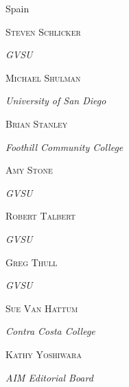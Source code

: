 \documentclass[10pt,]{book}
\theoremstyle{plain}
\theoremstyle{definition}
\theoremstyle{definition}
\theoremstyle{definition}
\theoremstyle{definition}
\numberwithin{equation}{section}
\newcommand{\contributor}[1]{\parbox{\linewidth}{#1}\par\bigskip}
\newcommand{\contributorname}[1]{\textsc{#1}\\[0.25\baselineskip]}
\newcommand{\contributorinfo}[1]{\hspace*{0.05\linewidth}\parbox{0.95\linewidth}{\textsl{#1}}}
\begin{document}
\begin{multicols}{2}
{{Spain}%
}%
\hypertarget{contributor-15}{}%
\contributor{%
\contributorname{Steven Schlicker}%
\contributorinfo{GVSU}%
}%
\hypertarget{contributor-16}{}%
\contributor{%
\contributorname{Michael Shulman}%
\contributorinfo{University of San Diego}%
}%
\hypertarget{contributor-17}{}%
\contributor{%
\contributorname{Brian Stanley}%
\contributorinfo{Foothill Community College}%
}%
\hypertarget{contributor-18}{}%
\contributor{%
\contributorname{Amy Stone}%
\contributorinfo{GVSU}%
}%
\hypertarget{contributor-19}{}%
\contributor{%
\contributorname{Robert Talbert}%
\contributorinfo{GVSU}%
}%
\hypertarget{contributor-20}{}%
\contributor{%
\contributorname{Greg Thull}%
\contributorinfo{GVSU}%
}%
\hypertarget{contributor-21}{}%
\contributor{%
\contributorname{Sue Van Hattum}%
\contributorinfo{Contra Costa College}%
}%
\hypertarget{contributor-22}{}%
\contributor{%
\contributorname{Kathy Yoshiwara}%
\contributorinfo{AIM Editorial Board}%
}%
\end{multicols}
\end{document}

